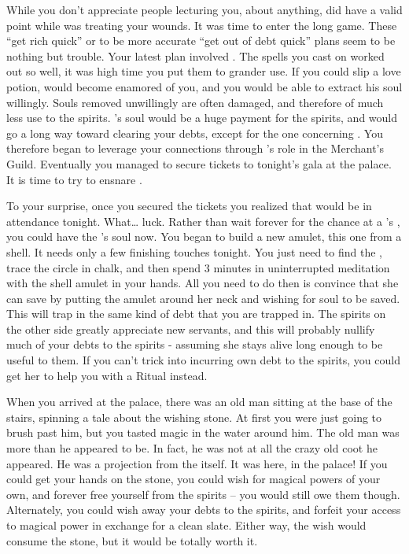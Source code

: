 \documentclass[char]{NeptuneBall}
\begin{document}
While you don't appreciate people lecturing you, about anything, \cManta{} did have a valid point while \cManta{\they} was treating your wounds. It was time to enter the long game. These ``get rich quick'' or to be more accurate ``get out of debt quick'' plans seem to be nothing but trouble. Your latest plan involved \cKing{\King} \cKing{}. The spells you cast on \cSlave{} worked out so well, it was high time you put them to grander use. If you could slip \cKing{} a love potion, \cKing{} would become enamored of you, and you would be able to extract his soul willingly. Souls removed unwillingly are often damaged, and therefore of much less use to the spirits. \cKing{}'s soul would be a huge payment for the spirits, and would go a long way toward clearing your debts, except for the one concerning \cAriel{}. You therefore began to leverage your connections through \cSlave{}'s role in the Merchant's Guild. Eventually you managed to secure tickets to tonight's gala at the palace. It is time to try to ensnare \cKing{}.

To your surprise, once you secured the tickets you realized that \cAriel{\King} \cAriel{} would be in attendance tonight. What\ldots{} luck. Rather than wait forever for the chance at a \cAriel{}'s \cArielsSon{\offspring}, you could have the \cAriel{\parent}'s soul now. You began to build a new amulet, this one from a shell. It needs only a few finishing touches tonight. You just need to find the \sRunicCircle{}, trace the circle in chalk, and then spend 3 minutes in uninterrupted meditation with the shell amulet in your hands.  All you need to do then is convince \cAriel{} that she can save \cAriel{\their} \cArielsSon{\offspring} by putting the amulet around her neck and wishing for \cArielsSon{\their} soul to be saved. This will trap \cAriel{} in the same kind of debt that you are trapped in. The spirits on the other side greatly appreciate new servants, and this will probably nullify much of your debts to the spirits - assuming she stays alive long enough to be useful to them. If you can't trick \cAriel{} into incurring \cAriel{\their} own debt to the spirits, you could get her to help you with a \gRitual{} Ritual instead.

When you arrived at the palace, there was an old man sitting at the base of the stairs, spinning a tale about the wishing stone. At first you were just going to brush past him, but you tasted magic in the water around him. The old man was more than he appeared to be. In fact, he was not at all the crazy old coot he appeared. He was a projection from the \iWishingStone{\MYname} itself. It was here, in the palace! If you could get your hands on the stone, you could wish for magical powers of your own, and forever free yourself from the spirits -- you would still owe them though. Alternately, you could wish away your debts to the spirits, and forfeit your access to magical power in exchange for a clean slate. Either way, the wish would consume the stone, but it would be totally worth it.
\end{document}

